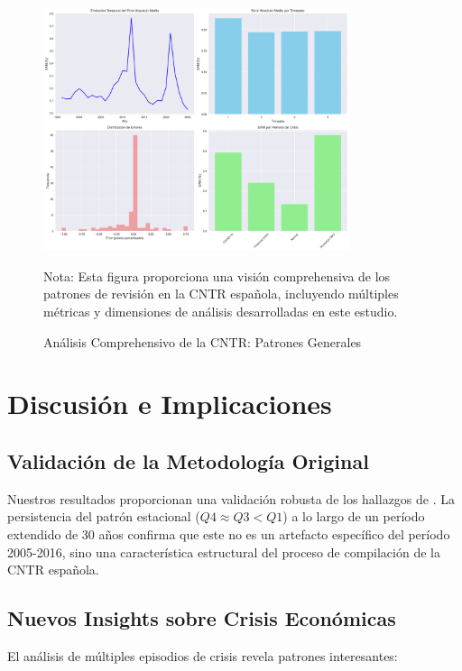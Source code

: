 \documentclass[12pt,a4paper]{article}
\begin{document}
\begin{figure}[h]
\centering
\includegraphics[width=0.8\textwidth]{../figuras/analisis_cntr_graficos.png}
\caption{Análisis Comprehensivo de la CNTR: Patrones Generales}
\label{fig:analisis_general}
\begin{flushleft}
\footnotesize
Nota: Esta figura proporciona una visión comprehensiva de los patrones de revisión en la CNTR española, incluyendo múltiples métricas y dimensiones de análisis desarrolladas en este estudio.
\end{flushleft}
\end{figure}

\section{Discusión e Implicaciones}

\subsection{Validación de la Metodología Original}

Nuestros resultados proporcionan una validación robusta de los hallazgos de \citet{pavia2017}. La persistencia del patrón estacional ($Q4 \approx Q3 < Q1$) a lo largo de un período extendido de 30 años confirma que este no es un artefacto específico del período 2005-2016, sino una característica estructural del proceso de compilación de la CNTR española.

\subsection{Nuevos Insights sobre Crisis Económicas}

El análisis de múltiples episodios de crisis revela patrones interesantes:
\end{document}
